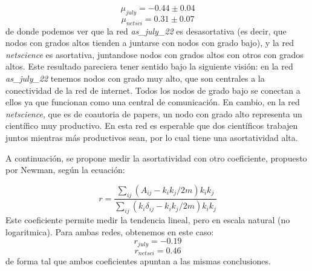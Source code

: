 \documentclass{article}
\begin{document}
\begin{equation}
\mu_{july} = -0.44 \pm 0.04
\end{equation}
\begin{equation}
\mu_{netsci} = 0.31 \pm 0.07 
\end{equation}
de donde podemos ver que la red \textit{as\_july\_22} es desasortativa (es decir, que nodos con grados altos tienden a juntarse con nodos con grado bajo), y la red \textit{netscience} es asortativa, juntandose nodos con grados altos con otros con grados altos. Este resultado pareciera tener sentido bajo la siguiente visión: en la red \textit{as\_july\_22} tenemos nodos con grado muy alto, que son centrales a la conectividad de la red de internet. Todos los nodos de grado bajo se conectan a ellos ya que funcionan como una central de comunicación. En cambio, en la red \textit{netscience}, que es de coautoria de papers, un nodo con grado alto representa un científico muy productivo. En esta red es esperable que dos científicos trabajen juntos mientras más productivos sean, por lo cual tiene una asortatividad alta.

A continuación, se propone medir la asortatividad con otro coeficiente, propuesto por Newman, según la ecuación:

\begin{equation}
r = \frac{\sum_{ij}(A_{ij}-k_i k_j/2m)k_i k_j}{\sum_{ij}(k_i\delta_{ij} -k_i k_j /2m)k_i k_j}
\end{equation}
Este coeficiente permite medir la tendencia lineal, pero en escala natural (no logaritmica). Para ambas redes, obtenemos en este caso:
\begin{equation}
r_{july} = -0.19
\end{equation}
\begin{equation}
r_{netsci} = 0.46 
\end{equation}
de forma tal que ambos coeficientes apuntan a las mismas conclusiones.
\end{document}
